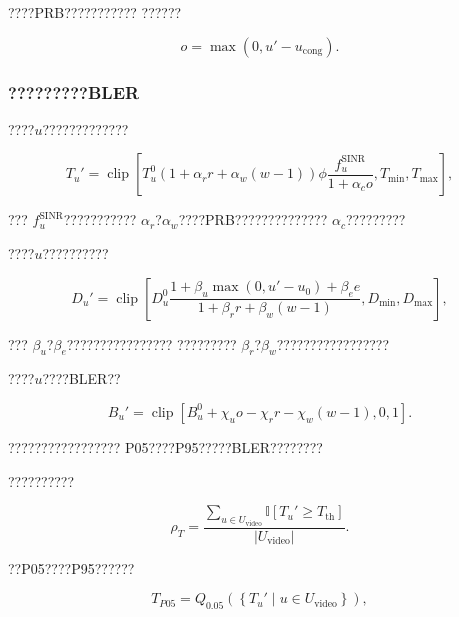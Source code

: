 ????PRB???????????
??????

\begin{equation}
o
=
\max
\left(
0,
u'-u_{\mathrm{cong}}
\right).
\label{eq:congestion_reduced}
\end{equation}


\subsubsection*{?????????BLER}

????$u$?????????????

\begin{equation}
T_u'
=
\operatorname{clip}
\left[
T_u^0
\left(
1+\alpha_rr+\alpha_w(w-1)
\right)
\phi
\frac{
f_u^{\mathrm{SINR}}
}{
1+\alpha_co
},
T_{\min},
T_{\max}
\right],
\label{eq:video_throughput_reduced}
\end{equation}

???
$f_u^{\mathrm{SINR}}$???????????
$\alpha_r$?$\alpha_w$????PRB??????????????
$\alpha_c$?????????

????$u$??????????

\begin{equation}
D_u'
=
\operatorname{clip}
\left[
D_u^0
\frac{
1+
\beta_u\max(0,u'-u_0)
+
\beta_ee
}{
1+
\beta_rr+
\beta_w(w-1)
},
D_{\min},
D_{\max}
\right],
\label{eq:video_delay_reduced}
\end{equation}

???
$\beta_u$?$\beta_e$????????????????
?????????
$\beta_r$?$\beta_w$?????????????????

????$u$????BLER??

\begin{equation}
B_u'
=
\operatorname{clip}
\left[
B_u^0
+
\chi_uo
-
\chi_rr
-
\chi_w(w-1),
0,
1
\right].
\label{eq:video_bler_reduced}
\end{equation}

?????????????????
P05????P95?????BLER????????

??????????

\begin{equation}
\rho_T
=
\frac{
\sum_{u\in U_{\mathrm{video}}}
\mathbb{I}
\left[
T_u'\geq T_{\mathrm{th}}
\right]
}{
\left|
U_{\mathrm{video}}
\right|
}.
\label{eq:video_satisfaction_eval_reduced}
\end{equation}

??P05????P95??????

\begin{equation}
T_{P05}
=
Q_{0.05}
\left(
\left\{
T_u'
\mid
u\in U_{\mathrm{video}}
\right\}
\right),
\label{eq:video_p05_reduced}
\end{equation}

